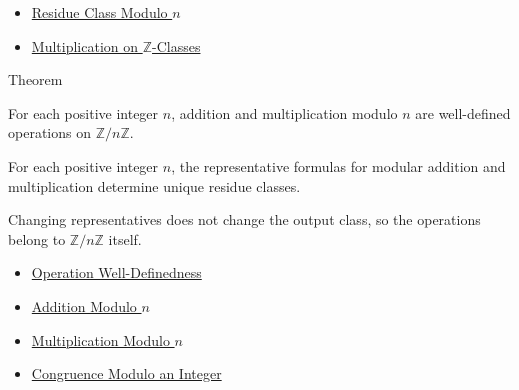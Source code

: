 \begin{dependencies}
\begin{itemize}
  \item \hyperref[def:residue-class-modulo-n]{Residue Class Modulo \(n\)}
  \item \hyperref[def:multiplication-on-z-classes]{Multiplication on \(\mathbb{Z}\)-Classes}
\end{itemize}
\end{dependencies}

\begin{theorembox}{Theorem}
\begin{theorem}
\label{thm:modular-operations-well-defined}
For each positive integer \(n\), addition and multiplication modulo \(n\) are
well-defined operations on \(\mathbb{Z}/n\mathbb{Z}\).
\end{theorem}

\begin{remark*}
For each positive integer \(n\), the representative formulas for modular
addition and multiplication determine unique residue classes.
\end{remark*}

\begin{remark*}[Interpretation]
Changing representatives does not change the output class, so the operations
belong to \(\mathbb{Z}/n\mathbb{Z}\) itself.
\end{remark*}
\end{theorembox}

\begin{dependencies}
\begin{itemize}
  \item \hyperref[def:operation-well-definedness]{Operation Well-Definedness}
  \item \hyperref[def:addition-modulo-n]{Addition Modulo \(n\)}
  \item \hyperref[def:multiplication-modulo-n]{Multiplication Modulo \(n\)}
  \item \hyperref[def:congruence-modulo-integer]{Congruence Modulo an Integer}
\end{itemize}
\end{dependencies}

